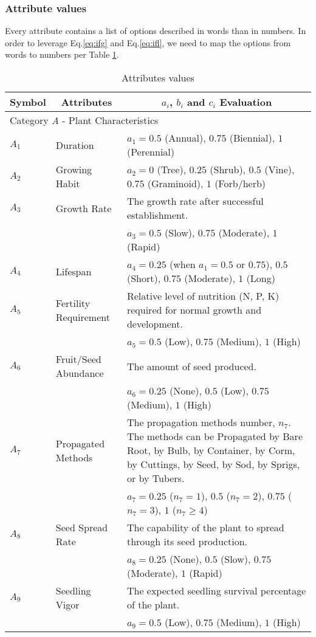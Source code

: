 \documentclass[12pt]{article}
\begin{document}
		\subsubsection{Attribute values}
		\label{sec:attr_value}
		
		Every attribute contains a list of options described in words than in numbers.  In order to leverage Eq.\ref{eq:ifg} and Eq.\ref{eq:ifl}, we need to map the options from words to numbers per Table \ref{tb:attributes}.
		\newpage
		{
			\fontsize{10}{14}\selectfont
			{
			\begin{longtable}{p{0.2in}p{1.5in}p{4.3in}}
				
				\caption{Attributes values}
				\label{tb:attributes}\\
				
				\toprule
				\multicolumn{1}{c}{\textbf{Symbol}} 
					& \multicolumn{1}{c}{\textbf{Attributes}}
					& \multicolumn{1}{c}{\textbf{$a_i$, $b_i$ and $c_i$ Evaluation}} \\
			
				\toprule
				\multicolumn{3}{l}{Category \textit{A} - Plant Characteristics}\\
				\midrule
				
				$A_1$ & Duration & $a_1=0.5$ (Annual), $0.75$ (Biennial), $1$ (Perennial)\\
				$A_2$ & Growing Habit & $a_2=0$ (Tree), $0.25$ (Shrub), $0.5$ (Vine), $0.75$ (Graminoid), $1$ (Forb/herb)\\ 
				$A_3$ & Growth Rate & The growth rate after successful establishment.\\
					&& $a_3=0.5$ (Slow), $0.75$ (Moderate), $1$ (Rapid)\\
				$A_4$ & Lifespan & $a_4=0.25$ (when $a_1=0.5$ or $0.75$), $0.5$ (Short), $0.75$ (Moderate), $1$ (Long) \\
				$A_5$ & Fertility Requirement & Relative level of nutrition (N, P, K) required for normal growth and development.\\
					 && $a_5=0.5$ (Low), $0.75$ (Medium), $1$ (High)\\
				$A_6$ & Fruit/Seed Abundance & The amount of seed produced.\\
					&& $a_6=0.25$ (None), $0.5$ (Low), $0.75$ (Medium), $1$ (High)\\
				$A_7$ & Propagated Methods & The propagation methods number, $n_7$. The methods can be Propagated by Bare Root, by Bulb, by Container, by Corm, by Cuttings, by Seed, by Sod, by Sprigs, or by Tubers. \\
					&& $a_7=0.25$ ($n_7=1$), $0.5$ ($n_7=2$), $0.75$ ($n_7=3$), $1$ ($n_7\geq4$)\\
				$A_8$ & Seed Spread Rate & The capability of the plant to spread through its seed production.\\
					&& $a_8=0.25$ (None), $0.5$ (Slow), $0.75$ (Moderate), $1$ (Rapid)\\
				$A_9$ & Seedling Vigor & The expected seedling survival percentage of the plant.\\
					&& $a_9=0.5$ (Low), $0.75$ (Medium), $1$ (High)\\
				

\end{longtable}}}
\end{document}
